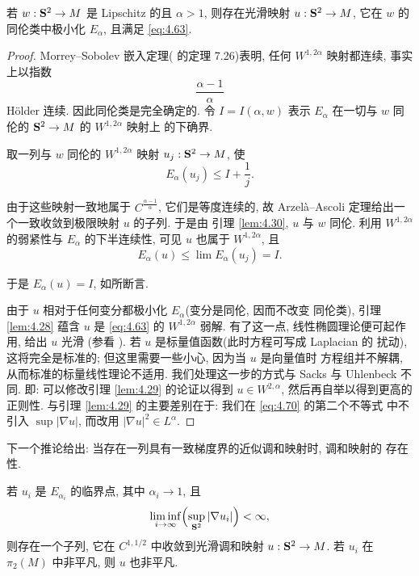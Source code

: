 \begin{proposition}
\label{prop:4.31}
若 $w:\mathbf{S}^2\to M$ 是 Lipschitz 的且 $\alpha>1$, 则存在光滑映射
$u:\mathbf{S}^2\to M$, 它在 $w$ 的同伦类中极小化 $E_\alpha$, 且满足
\eqref{eq:4.63}.
\end{proposition}

\begin{proof}
Morrey--Sobolev 嵌入定理(\cite{GiTr} 的定理 7.26)表明, 任何
$W^{1,2\alpha}$ 映射都连续, 事实上以指数
\begin{equation*}
\frac{\alpha-1}{\alpha}
\end{equation*}
H\"older 连续. 因此同伦类是完全确定的. 令 $I=I(\alpha,w)$ 表示
$E_\alpha$ 在一切与 $w$ 同伦的 $\mathbf{S}^2\to M$ 的 $W^{1,2\alpha}$ 映射上
的下确界.

取一列与 $w$ 同伦的 $W^{1,2\alpha}$ 映射 $u_j:\mathbf{S}^2\to M$, 使
\begin{equation}
E_\alpha(u_j)\leq I+\frac1j.
\label{eq:4.74}
\end{equation}

由于这些映射一致地属于 $C^{\frac{\alpha-1}{\alpha}}$, 它们是等度连续的,
故 Arzel\`a--Ascoli 定理给出一个一致收敛到极限映射 $u$ 的子列. 于是由
引理 \ref{lem:4.30}, $u$ 与 $w$ 同伦. 利用 $W^{1,2\alpha}$ 的弱紧性与
$E_\alpha$ 的下半连续性, 可见 $u$ 也属于 $W^{1,2\alpha}$, 且
\begin{equation}
E_\alpha(u)\leq\lim E_\alpha(u_j)=I.
\label{eq:4.75}
\end{equation}

于是 $E_\alpha(u)=I$, 如所断言.

由于 $u$ 相对于任何变分都极小化 $E_\alpha$(变分是同伦, 因而不改变
同伦类), 引理 \ref{lem:4.28} 蕴含 $u$ 是 \eqref{eq:4.63} 的
$W^{1,2\alpha}$ 弱解. 有了这一点, 线性椭圆理论便可起作用, 给出 $u$ 光滑
(参看 \cite{Mo2}). 若 $u$ 是标量值函数(此时方程可写成 Laplacian 的
扰动), 这将完全是标准的; 但这里需要一些小心, 因为当 $u$ 是向量值时
方程组并不解耦, 从而标准的标量线性理论不适用. 我们处理这一步的方式与
Sacks 与 Uhlenbeck 不同. 即: 可以修改引理 \ref{lem:4.29} 的论证以得到
$u\in W^{2,\alpha}$, 然后再自举以得到更高的正则性. 与引理
\ref{lem:4.29} 的主要差别在于: 我们在 \eqref{eq:4.70} 的第二个不等式
中不引入 $\sup|\nabla u|$, 而改用 $|\nabla u|^2\in L^\alpha$.
\end{proof}

下一个推论给出: 当存在一列具有一致梯度界的近似调和映射时, 调和映射的
存在性.

\begin{corollary}
\label{cor:4.32}
若 $u_i$ 是 $E_{\alpha_i}$ 的临界点, 其中 $\alpha_i\to1$, 且
\begin{equation}
\liminf_{i\to\infty}\Bigl(\sup_{\mathbf{S}^2}|\nabla u_i|\Bigr)<\infty,
\label{eq:4.76}
\end{equation}
则存在一个子列, 它在 $C^{1,1/2}$ 中收敛到光滑调和映射
$u:\mathbf{S}^2\to M$. 若 $u_i$ 在 $\pi_2(M)$ 中非平凡, 则 $u$ 也非平凡.
\end{corollary}

